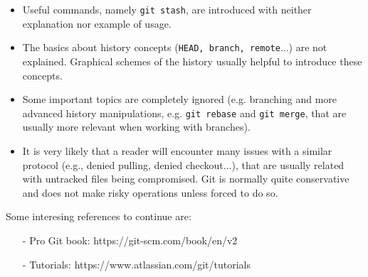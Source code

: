 \documentclass[a4paper,10pt]{article}
\begin{document}
\begin{itemize}
 \item Useful commands, namely \texttt{git stash}, are introduced with neither explanation nor example of usage.
 \item The basics about history concepts (\texttt{HEAD, branch, remote}...) are not explained. Graphical schemes of the history usually helpful to introduce these concepts.
 \item Some important topics are completely ignored (e.g. branching and more advanced history manipulations, e.g. \texttt{git rebase} and \texttt{git merge}, that are usually more  relevant when working with branches).
 \item It is very likely that a reader will encounter many issues with a similar protocol (e.g., denied pulling, denied checkout...), that are usually related with untracked files being compromised. Git is normally quite conservative and does not make risky operations unless forced to do so.
\end{itemize}
\vspace*{0.5cm}

Some interesing references to continue are:
\begin{itemize}
 \item[-] Pro Git book: https://git-scm.com/book/en/v2
 \item[-] Tutorials: https://www.atlassian.com/git/tutorials
\end{itemize}
\end{document}
